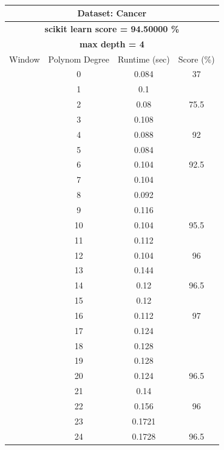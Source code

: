 \documentclass{article}
\begin{document}
\begin{multicols}{2}
\begin{table}[H]
\caption{}
\label{tab:my-table}
\begin{tabular}{|c|c|c|c|}
\hline
\multicolumn{4}{|c|}{\textbf{Dataset: Cancer}} \\ \hline
\multicolumn{4}{|c|}{\textbf{scikit learn score = 94.50000  \%}} \\ \hline
\multicolumn{4}{|c|}{\textbf{max depth = 4}} \\ \hline
Window & Polynom Degree & Runtime (sec) & Score (\%) \\ \hline
 & 0 & 0.084 & 37 \\ \cline{2-4} 
 & 1 & 0.1 &  \\ \cline{2-3}
 & 2 & 0.08 & \multirow{-2}{*}{75.5} \\ \cline{2-4} 
 & 3 & 0.108 &  \\ \cline{2-3}
 & 4 & 0.088 & \multirow{-2}{*}{92} \\ \cline{2-4} 
 & 5 & 0.084 &  \\ \cline{2-3}
 & 6 & 0.104 & \multirow{-2}{*}{92.5} \\ \cline{2-4} 
 & 7 & 0.104 &  \\ \cline{2-3}
 & 8 & 0.092 &  \\ \cline{2-3}
 & 9 & 0.116 &  \\ \cline{2-3}
 & 10 & 0.104 & \multirow{-4}{*}{95.5} \\ \cline{2-4} 
 & 11 & 0.112 &  \\ \cline{2-3}
 & 12 & 0.104 & \multirow{-2}{*}{96} \\ \cline{2-4} 
 & 13 & 0.144 &  \\ \cline{2-3}
 & 14 & 0.12 & \multirow{-2}{*}{96.5} \\ \cline{2-4} 
 & \cellcolor[HTML]{FFFFC7}15 & \cellcolor[HTML]{FFFFC7}0.12 & \cellcolor[HTML]{FFFFC7} \\ \cline{2-3}
 & 16 & 0.112 & \multirow{-2}{*}{\cellcolor[HTML]{FFFFC7}97} \\ \cline{2-4} 
 & 17 & 0.124 &  \\ \cline{2-3}
 & 18 & 0.128 &  \\ \cline{2-3}
 & 19 & 0.128 &  \\ \cline{2-3}
 & 20 & 0.124 & \multirow{-4}{*}{96.5} \\ \cline{2-4} 
 & 21 & 0.14 &  \\ \cline{2-3}
 & 22 & 0.156 & \multirow{-2}{*}{96} \\ \cline{2-4} 
 & 23 & 0.1721 &  \\ \cline{2-3}
 & 24 & 0.1728 & \multirow{-2}{*}{96.5} \\ \cline{2-4} 

\end{tabular}
\end{table}
\end{multicols}
\end{document}
